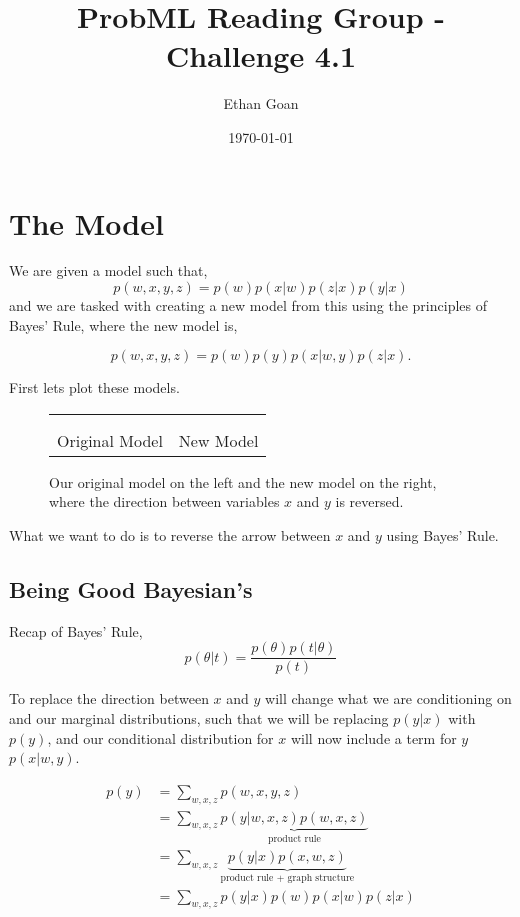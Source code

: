 \documentclass[11pt]{article}
\author{Ethan Goan}
\date{\today}
\title{ProbML Reading Group - Challenge 4.1}
\begin{document}
\maketitle


\section{The Model}
\label{sec:org5b48f49}
We are given a model such that,
\[ p(w,x,y,z) = p(w)p(x|w)p(z|x)p(y|x) \]
and we are tasked with creating a new model from this using the principles of Bayes' Rule, where the new model is,

\[ p(w,x,y,z) = p(w)p(y)p(x|w,y)p(z|x). \]

First lets plot these models.
\begin{figure}[!h]
  \begin{center}
    \begin{tabular}{L{5cm}R{5cm}}
       &
      
      \\
      \\
      Original Model & New Model
    \end{tabular}
  \end{center}
  \caption{Our original model on the left and the new model on the right, where the direction between variables $x$ and $y$ is reversed.}
\end{figure}


What we want to do is to reverse the arrow between \(x\) and \(y\) using Bayes' Rule.

\subsection{Being Good Bayesian's}
Recap of Bayes' Rule,
\[ p(\theta | t)  =  \frac{p(\theta) p(t | \theta)}{p(t)}\]

To replace the direction between \(x\) and \(y\) will change what we are conditioning on and our marginal distributions, such that we will be replacing
\(p(y|x)\) with \(p(y)\), and our conditional distribution for \(x\) will now include a term for \(y\) \(p(x | w, y)\).

\begin{align*}
p(y) &= \sum_{w,x,z} p(w,x,y,z)
\\
 & = \sum_{w,x,z} \underbrace{p(y|w,x,z)p(w,x,z)}_{\text{product rule}}
\\
 & = \sum_{w,x,z} \underbrace{p(y|x)p(x,w,z)}_{\text{product rule + graph structure}}
\\
 & = \sum_{w,x,z} p(y|x) p(w) p(x|w)p(z|x)
\end{align*}
\end{document}
